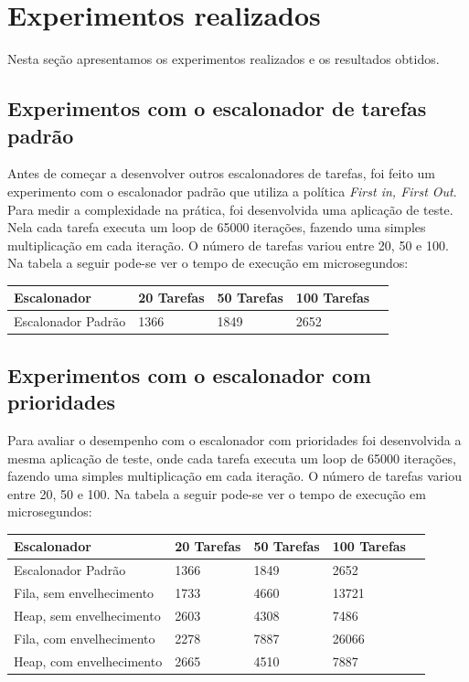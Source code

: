 \documentclass[a4paper, 10pt]{article}
\begin{document}


\section{Experimentos realizados}\label{resultados}
Nesta seção apresentamos os experimentos realizados e os resultados obtidos.

\subsection{Experimentos com o escalonador de tarefas padrão}
Antes de começar a desenvolver outros escalonadores de tarefas, foi feito um experimento com o escalonador 
padrão que utiliza a política \textit{First in, First Out}.
Para medir a complexidade na prática, foi desenvolvida uma aplicação de teste. Nela cada tarefa executa um loop de 65000
iterações, fazendo uma simples multiplicação em cada iteração. O número de tarefas variou entre 20, 50 e 100.
Na tabela a seguir pode-se ver o tempo de execução em microsegundos:
\begin{center}
    \begin{tabular}{ | l | l | l | l | p{5cm} |}
    \hline
    Escalonador              & 20 Tarefas & 50 Tarefas & 100 Tarefas \\ \hline
    Escalonador Padrão       & 1366 & 1849 & 2652 \\ \hline
    \end{tabular}
\end{center}

\subsection{Experimentos com o escalonador com prioridades}
Para avaliar o desempenho com o escalonador com prioridades foi desenvolvida a mesma aplicação de teste,
onde cada tarefa executa um loop de 65000 iterações, fazendo uma simples multiplicação em cada iteração. 
O número de tarefas variou entre 20, 50 e 100.
Na tabela a seguir pode-se ver o tempo de execução em microsegundos:
\begin{center}
    \begin{tabular}{ | l | l | l | l | p{5cm} |}
    \hline
    Escalonador              & 20 Tarefas & 50 Tarefas & 100 Tarefas \\ \hline
    Escalonador Padrão       & 1366 & 1849 & 2652 \\ \hline 
    Fila, sem envelhecimento & 1733 & 4660 & 13721 \\ \hline 
    Heap, sem envelhecimento & 2603 & 4308 & 7486 \\ \hline
    Fila, com envelhecimento & 2278 & 7887 & 26066 \\ \hline
    Heap, com envelhecimento & 2665 & 4510 & 7887 \\ \hline
    \end{tabular}
\end{center}
\end{document}
